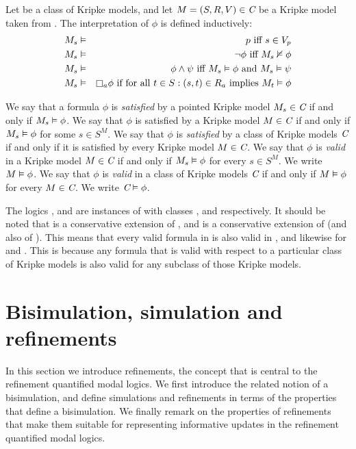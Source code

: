 \begin{definition}
Let \classC{} be a class of Kripke models, and let $M = (S, R, V) \in \textit{C}$
be a Kripke model taken from \classC{}. The interpretation of $\phi$ is defined
inductively:
\begin{eqnarray*}
M_s &\entails& p \text{ iff } s \in V_p\\
M_s &\entails& \neg \phi \text{ iff } M_s \nentails \phi\\
M_s &\entails& \phi \land \psi \text{ iff } M_s \entails \phi \text{ and } M_s
\entails \psi\\
M_s &\entails& \knows_a \phi \text{ if for all } t \in S : (s, t) \in R_a \text{
implies } M_t \entails \phi
\end{eqnarray*}
\end{definition}

We say that a formula $\phi$ is {\em satisfied} by a pointed Kripke model $M_s
\in \textit{C}$ if and only if $M_s \vDash \phi$. We say that $\phi$ is satisfied
by a Kripke model $M \in \textit{C}$ if and only if $M_s \vDash \phi$ for some $s
\in S^M$. We say that $\phi$ is {\em satisfied} by a class of Kripke models
$\textit{C}$ if and only if it is satisfied by every Kripke model $M \in \textit{C}$.
We say that $\phi$ is {\em valid} in a Kripke model $M \in \textit{C}$ if and only
if $M_s \vDash \phi$ for every $s \in S^M$. We write $M \vDash \phi$. We say
that $\phi$ is {\em valid} in a class of Kripke models $\textit{C}$ if and only if
$M \vDash \phi$ for every $M \in \textit{C}$. We write $\textit{C} \vDash \phi$.

The logics \logicK{}, \logicKD{} and \logicS{} are instances of \logicC{} with
classes \classK{}, \classKD{} and \classS{} respectively. It should be noted
that \logicKD{} is a conservative extension of \logicK{}, and \logicS{} is a
conservative extension of \logicKD{} (and also of \logicK{}). This means that
every valid formula in \logicK{} is also valid in \logicKD{}, and likewise for
\logicKD{} and \logicS{}. This is because any formula that is valid with respect
to a particular class of Kripke models is also valid for any subclass of those
Kripke models.

\section{Bisimulation, simulation and refinements}\label{bisimulation}

In this section we introduce refinements, the concept that is central to the
refinement quantified modal logics. We first introduce the related notion of a
bisimulation, and define simulations and refinements in terms of the properties
that define a bisimulation. We finally remark on the properties of refinements
that make them suitable for representing informative updates in the refinement
quantified modal logics.

